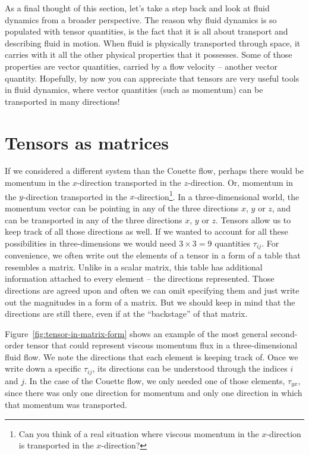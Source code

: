 \documentclass[10pt,twocolumn]{article}
\begin{document}
As a final thought of this section, let's take a step back and look at fluid dynamics from a broader perspective. The reason why fluid dynamics is so populated with tensor quantities, is the fact that it is all about transport and describing fluid in motion. When fluid is physically transported through space, it carries with it all the other physical properties that it possesses. Some of those properties are vector quantities, carried by a flow velocity -- another vector quantity. Hopefully, by now you can appreciate that tensors are very useful tools in fluid dynamics, where vector quantities (such as momentum) can be transported in many directions!

\section*{Tensors as matrices}

If we considered a different system than the Couette flow, perhaps there would be momentum in the $x$-direction transported in the $z$-direction. Or, momentum in the $y$-direction transported in the $x$-direction\footnote{Can you think of a real situation where viscous momentum in the $x$-direction is transported in the $x$-direction?}. In a three-dimensional world, the momentum vector can be pointing in any of the three directions $x$, $y$ or $z$, and can be transported in any of the three directions $x$, $y$ or $z$. Tensors allow us to keep track of all those directions as well. If we wanted to account for all these possibilities in three-dimensions we would need $3 \times 3 = 9$ quantities $\tau_{ij}$. For convenience, we often write out the elements of a tensor in a form of a table that resembles a matrix. Unlike in a scalar matrix, this table has additional information attached to every element -- the directions represented. Those directions are agreed upon and often we can omit specifying them and just write out the magnitudes in a form of a matrix. But we should keep in mind that the directions are still there, even if at the ``backstage'' of that matrix.

Figure~\ref{fig:tensor-in-matrix-form} shows an example of the most general second-order tensor that could represent viscous momentum flux in a three-dimensional fluid flow. We note the directions that each element is keeping track of. Once we write down a specific $\tau_{ij}$, its directions can be understood through the indices $i$ and $j$. In the case of the Couette flow, we only needed one of those elements, $\tau_{yx}$, since there was only one direction for momentum and only one direction in which that momentum was transported.
\end{document}

